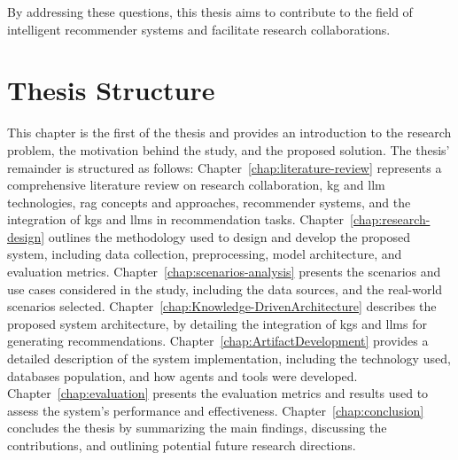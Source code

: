 By addressing these questions, this thesis aims to contribute to the field of intelligent recommender systems and facilitate research collaborations.

\section{Thesis Structure}\label{sec:thesis-structure}
This chapter is the first of the thesis and provides an introduction to the research problem, the motivation behind the study, and the proposed solution.
The thesis' remainder is structured as follows: Chapter~\ref{chap:literature-review} represents a comprehensive literature review on research collaboration, \gls{kg} and \gls{llm} technologies, \gls{rag} concepts and approaches, recommender systems, and the integration of \glspl{kg} and \glspl{llm} in recommendation tasks.
Chapter~\ref{chap:research-design} outlines the methodology used to design and develop the proposed system, including data collection, preprocessing, model architecture, and evaluation metrics.
Chapter~\ref{chap:scenarios-analysis} presents the scenarios and use cases considered in the study, including the data sources, and the real-world scenarios selected.
Chapter~\ref{chap:Knowledge-DrivenArchitecture} describes the proposed system architecture, by detailing the integration of \glspl{kg} and \glspl{llm} for generating recommendations.
Chapter~\ref{chap:ArtifactDevelopment} provides a detailed description of the system implementation, including the technology used, databases population, and how agents and tools were developed.
Chapter~\ref{chap:evaluation} presents the evaluation metrics and results used to assess the system's performance and effectiveness.
Chapter~\ref{chap:conclusion} concludes the thesis by summarizing the main findings, discussing the contributions, and outlining potential future research directions.
%